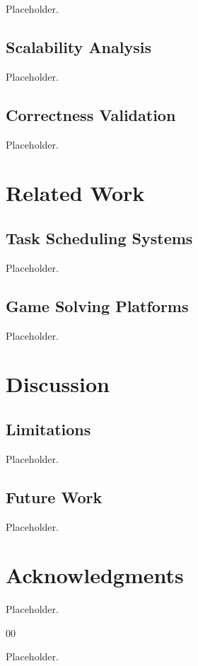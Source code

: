 \documentclass[conference]{IEEEtran}
\begin{document}
Placeholder.

\subsection{Scalability Analysis}

Placeholder.

\subsection{Correctness Validation}

Placeholder.

\section{Related Work}

\subsection{Task Scheduling Systems}

Placeholder.

\subsection{Game Solving Platforms}

Placeholder.

\section{Discussion}

\subsection{Limitations}

Placeholder.

\subsection{Future Work}

Placeholder.

\section*{Acknowledgments}

Placeholder.

\begin{thebibliography}{00}

 Placeholder.

\end{thebibliography}
\end{document}
